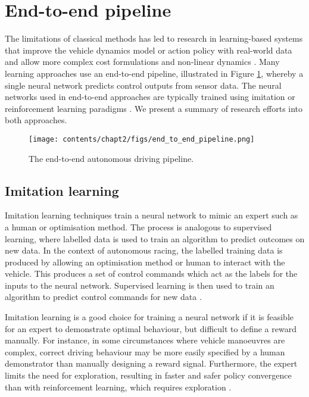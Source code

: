 \section{End-to-end pipeline}
\label{sec:end_to_end}

The limitations of classical methods has led to research in learning-based systems that improve the vehicle dynamics model or action policy with real-world data and allow more complex cost formulations and non-linear dynamics \cite{Fuchs2021}.
Many learning approaches use an end-to-end pipeline, illustrated in Figure \ref{fig:end_to_end}, whereby a single neural network predicts control outputs from sensor data.
The neural networks used in end-to-end approaches are typically trained using imitation or reinforcement learning paradigms \cite{Betz2021}. We present a summary of research efforts into both approaches.

\begin{figure}[h]
    \centering
    \texttt{[image: contents/chapt2/figs/end\_to\_end\_pipeline.png]}
    \caption{The end-to-end autonomous driving pipeline.}
    \label{fig:end_to_end}
\end{figure}

\subsection{Imitation learning}
\label{sec:imitation_learning}

Imitation learning techniques train a neural network to mimic an expert such as a human or optimisation method.
The process is analogous to supervised learning, where labelled data is used to train an algorithm to predict outcomes on new data.
In the context of autonomous racing, the labelled training data is produced by allowing an optimisation method or human to interact with the vehicle.
This produces a set of control commands which act as the labels for the inputs to the neural network.
Supervised learning is then used to train an algorithm to predict control commands for new data \cite{Osa_2018}.


Imitation learning is a good choice for training a neural network if it is feasible for an expert to demonstrate optimal behaviour, but difficult to define a reward manually.
For instance, in some circumstances where vehicle manoeuvres are complex, correct driving behaviour may be more easily specified by a human demonstrator than manually designing a reward signal.
Furthermore, the expert limits the need for exploration, resulting in faster and safer policy convergence than with reinforcement learning, which requires exploration \cite{Osa_2018}.


